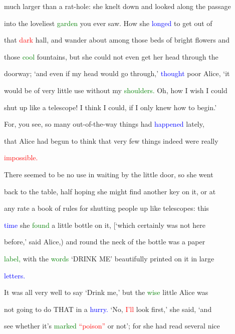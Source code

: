  much larger than a rat-hole: she knelt down and looked along the passage

 into the \textcolor{BurntOrange}{loveliest} \textcolor{green}{garden} you ever saw. How she \textcolor{blue}{longed} to get out of

 that \textcolor{red}{dark} hall, and wander about among those beds of bright flowers and

 those \textcolor{green}{cool} fountains, but she could not even get her head through the

 doorway; ‘and even if my head would go through,’ \textcolor{blue}{thought} poor Alice, ‘it

 would be of very little use without my \textcolor{green}{shoulders.} Oh, how I wish I could

 shut up like a telescope! I think I could, if I only knew how to begin.’

 For, you see, so many out-of-the-way things had \textcolor{blue}{happened} lately,

 that Alice had begun to think that very few things indeed were really

 \textcolor{red}{impossible.}



 There seemed to be no use in \textcolor{BurntOrange}{waiting} by the little door, so she went

 back to the table, half hoping she might find another key on it, or at

 any rate a book of \textcolor{BurntOrange}{rules} for shutting people up like telescopes: this

 \textcolor{blue}{time} she \textcolor{green}{found} a little bottle on it, [‘which certainly was not here

 before,’ said Alice,) and round the neck of the bottle was a paper

 \textcolor{green}{label,} with the \textcolor{green}{words} ‘DRINK ME’ beautifully printed on it in large

 \textcolor{blue}{letters.}



 It was all very well to say ‘Drink me,’ but the \textcolor{green}{wise} little Alice was

 not going to do THAT in a \textcolor{blue}{hurry.} ‘No, \textcolor{red}{I’ll} look first,’ she said, ‘and

 see whether it’s \textcolor{green}{marked} \textcolor{red}{“poison”} or not’; for she had read several nice

